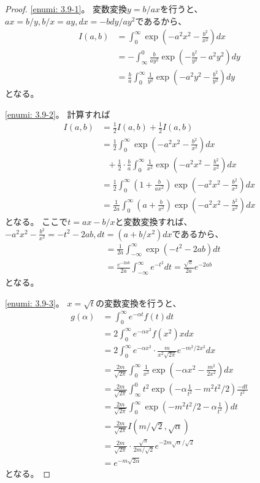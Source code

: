 \documentclass[uplatex]{jsarticle}
\theoremstyle{definition}
\begin{document}
\begin{proof}
  \ref{enumi: 3.9-1}。
  変数変換\(y=b/ax\)を行うと、\(ax = b/y , b/x = ay, dx=-bdy/ay^2\)であるから、
  \begin{align*}
    I(a,b) &= \int_0^\infty \exp \left(
    -a^2x^2-\frac{b^2}{x^2}
    \right) dx \\
    &= - \int_\infty^0 \frac{b}{ay^2}\exp \left(
    -\frac{b^2}{y^2}-a^2y^2
    \right) dy \\
    &= \frac{b}{a}\int_0^\infty \frac{1}{y^2}\exp \left(
    -a^2y^2-\frac{b^2}{y^2}
    \right) dy
  \end{align*}
  となる。

  \ref{enumi: 3.9-2}。
  計算すれば
  \begin{align*}
    I(a,b) &= \frac{1}{2}I(a,b) + \frac{1}{2}I(a,b) \\
    &= \frac{1}{2} \int_0^\infty
    \exp \left(-a^2x^2-\frac{b^2}{x^2}\right) dx \\
    &\ \ \ + \frac{1}{2}\cdot\frac{b}{a}\int_0^\infty \frac{1}{x^2}
    \exp \left(-a^2x^2-\frac{b^2}{x^2}\right) dx \\
    &= \frac{1}{2} \int_0^\infty \left( 1+ \frac{b}{ax^2}\right)
    \exp \left( -a^2x^2-\frac{b^2}{x^2}\right) dx \\
    &= \frac{1}{2a} \int_0^\infty \left( a + \frac{b}{x^2}\right)
    \exp \left( -a^2x^2-\frac{b^2}{x^2}\right) dx
  \end{align*}
  となる。
  ここで\(t=ax-b/x\)と変数変換すれば、
  \(-a^2x^2-\frac{b^2}{x^2} = -t^2 - 2ab,
  dt = (a+b/x^2)dx\)であるから、
  \begin{align*}
    &= \frac{1}{2a} \int_{-\infty}^\infty
    \exp \left( -t^2 - 2ab\right) dt \\
    &= \frac{e^{-2ab}}{2a} \int_{-\infty}^\infty e^{-t^2}dt
    = \frac{\sqrt{\pi}}{2a}e^{-2ab}
  \end{align*}
  となる。

  \ref{enumi: 3.9-3}。
  \(x=\sqrt{t}\)の変数変換を行うと、
  \begin{align*}
    g(\alpha)
    &= \int_0^\infty e^{-\alpha t}f(t) dt \\
    &= 2\int_0^\infty e^{-\alpha x^2}f(x^2) xdx \\
    &= 2\int_0^\infty e^{-\alpha x^2}\cdot
    \frac{m}{x^2\sqrt{2\pi}}e^{-m^2/2x^2} dx \\
    &= \frac{2m}{\sqrt{2\pi}}\int_0^\infty \frac{1}{x^2}
    \exp \left( -\alpha x^2-\frac{m^2}{2x^2}\right) dx \\
    &= \frac{2m}{\sqrt{2\pi}}\int_{\infty}^0 t^2
    \exp \left( -\alpha \frac{1}{t^2}-m^2t^2/2\right) \frac{-dt}{t^2} \\
    &= \frac{2m}{\sqrt{2\pi}}\int_0^{\infty}
    \exp \left( -m^2t^2/2-\alpha \frac{1}{t^2}\right) dt \\
    &= \frac{2m}{\sqrt{2\pi}} I(m/\sqrt{2},\sqrt{\alpha}) \\
    &= \frac{2m}{\sqrt{2\pi}} \cdot
    \frac{\sqrt{\pi}}{2m/\sqrt{2}}e^{-2m\sqrt{\alpha}/\sqrt{2}} \\
    &= e^{-m\sqrt{2\alpha}}
  \end{align*}
  となる。
\end{proof}
\end{document}
